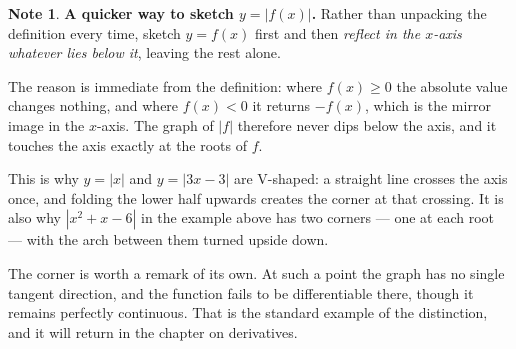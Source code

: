 \documentclass[11pt,a4paper]{article}
\theoremstyle{definition}
\newtheorem{note}[thm]{Note}
\begin{document}
\begin{note}
\textbf{A quicker way to sketch $y=\left|f(x)\right|$.} Rather than unpacking the
definition every time, sketch $y=f(x)$ first and then \emph{reflect in the
$x$-axis whatever lies below it}, leaving the rest alone.

The reason is immediate from the definition: where $f(x)\geq 0$ the absolute value
changes nothing, and where $f(x)<0$ it returns $-f(x)$, which is the mirror image
in the $x$-axis. The graph of $\left|f\right|$ therefore never dips below the axis,
and it touches the axis exactly at the roots of $f$.

This is why $y=\left|x\right|$ and $y=\left|3x-3\right|$ are V-shaped: a straight
line crosses the axis once, and folding the lower half upwards creates the corner
at that crossing. It is also why $\left|x^{2}+x-6\right|$ in the example above has
two corners --- one at each root --- with the arch between them turned upside down.

The corner is worth a remark of its own. At such a point the graph has no single
tangent direction, and the function fails to be differentiable there, though it
remains perfectly continuous. That is the standard example of the distinction, and
it will return in the chapter on derivatives.
\end{note}
\end{document}
